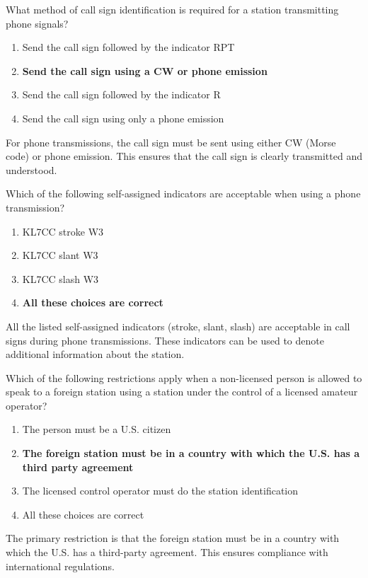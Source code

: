 
\begin{tcolorbox}[colback=gray!10!white,colframe=black!75!black,title={T1F05}]
    What method of call sign identification is required for a station transmitting phone signals?
    \begin{enumerate}[label=\Alph*),noitemsep]
        \item Send the call sign followed by the indicator RPT
        \item \textbf{Send the call sign using a CW or phone emission}
        \item Send the call sign followed by the indicator R
        \item Send the call sign using only a phone emission
    \end{enumerate}
\end{tcolorbox}
For phone transmissions, the call sign must be sent using either CW (Morse code) or phone emission. This ensures that the call sign is clearly transmitted and understood.


\begin{tcolorbox}[colback=gray!10!white,colframe=black!75!black,title={T1F06}]
    Which of the following self-assigned indicators are acceptable when using a phone transmission?
    \begin{enumerate}[label=\Alph*),noitemsep]
        \item KL7CC stroke W3
        \item KL7CC slant W3
        \item KL7CC slash W3
        \item \textbf{All these choices are correct}
    \end{enumerate}
\end{tcolorbox}
All the listed self-assigned indicators (stroke, slant, slash) are acceptable in call signs during phone transmissions. These indicators can be used to denote additional information about the station.


\begin{tcolorbox}[colback=gray!10!white,colframe=black!75!black,title={T1F07}]
    Which of the following restrictions apply when a non-licensed person is allowed to speak to a foreign station using a station under the control of a licensed amateur operator?
    \begin{enumerate}[label=\Alph*),noitemsep]
        \item The person must be a U.S. citizen
        \item \textbf{The foreign station must be in a country with which the U.S. has a third party agreement}
        \item The licensed control operator must do the station identification
        \item All these choices are correct
    \end{enumerate}
\end{tcolorbox}
The primary restriction is that the foreign station must be in a country with which the U.S. has a third-party agreement. This ensures compliance with international regulations.

